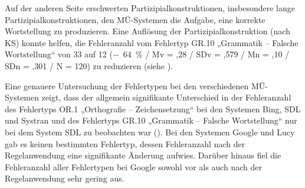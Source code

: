 Auf der anderen Seite erschwerten Partizipialkonstruktionen, insbesondere lange Partizipialkonstruktionen, den MÜ-Systemen die Aufgabe, eine korrekte Wortstellung zu produzieren. Eine Auflösung der Partizipialkonstruktion (nach KS) konnte helfen, die Fehleranzahl vom Fehlertyp GR.10 „Grammatik -- Falsche Wortstellung“ von 33 auf 12 ($-$~64~\% / Mv = ,28 / SDv = ,579 / Mn = ,10 / SDn = ,301 / N = 120) zu reduzieren (siehe ).


Eine genauere Untersuchung der Fehlertypen bei den verschiedenen MÜ-Sys\-te\-men zeigt, dass der allgemein signifikante Unterschied in der Fehleranzahl des Fehlertyps OR.1 „Orthografie -- Zeichensetzung“ bei den Systemen Bing, SDL und Systran und des Fehlertyps GR.10 „Grammatik -- Falsche Wortstellung“ nur bei dem System SDL zu beobachten war (). Bei den Systemen Google und Lucy gab es keinen bestimmten Fehlertyp, dessen Fehleranzahl nach der Regelanwendung eine signifikante Änderung aufwies. Darüber hinaus fiel die Fehleranzahl aller Fehlertypen bei Google sowohl vor als auch nach der Regelanwendung sehr gering aus.


